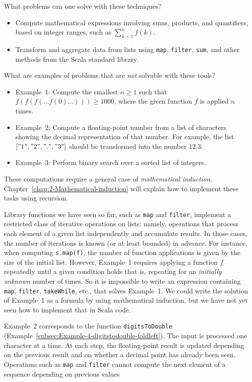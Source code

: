 What problems can one solve with these techniques?
\begin{itemize}
\item Compute mathematical expressions involving sums, products, and quantifiers,
based on integer ranges, such as $\sum_{k=1}^{n}f(k)$.
\item Transform and aggregate data from lists using \lstinline!map!, \lstinline!filter!,\textbf{
}\lstinline!sum!, and other methods from the Scala standard library.
\end{itemize}
What are examples of problems that are \emph{not} solvable with these
tools?
\begin{itemize}
\item Example~1: Compute the smallest $n\geq1$ such that $f(f(f(...f(0)...)))\geq1000$,
where the given function $f$ is applied $n$ times.
\item Example~2: Compute a floating-point number from a list of characters
showing the decimal representation of that number. For example, the
list $\left["1","2",".","3"\right]$ should be transformed into the
number $12.3$. 
\item Example~3: Perform binary search over a sorted list of integers.
\end{itemize}
These computations require a general case of \emph{mathematical induction}.
Chapter\ \ref{chap:2-Mathematical-induction} will explain how to
implement these tasks using recursion.

Library functions we have seen so far, such as \texttt{}\lstinline!map!
and \lstinline!filter!, implement a restricted class of iterative
operations on lists: namely, operations that process each element
of a given list independently and accumulate results. In those cases,
the number of iterations is known (or at least bounded) in advance.
For instance, when computing \lstinline!s.map(f)!, the number of
function applications is given by the size of the initial list. However,
Example\ 1 requires applying a function $f$ repeatedly until a given
condition holds \textemdash{} that is, repeating for an \emph{initially
unknown} number of times. So it is impossible to write an expression
containing \lstinline!map!, \lstinline!filter!, \lstinline!takeWhile!,
etc., that solves Example\ 1. We could write the solution of Example\ 1
as a formula by using mathematical induction, but we have not yet
seen how to implement that in Scala code. 

Example\ 2 corresponds to the function \lstinline!digitsToDouble!
(Example~\ref{subsec:Example-4-digitstodouble-foldleft}). The input
is processed one character at a time. At each step, the floating-point
result is updated depending on the previous result and on whether
a decimal point has already been seen. Operations such as \texttt{}\lstinline!map!
and \texttt{}\lstinline!filter! cannot compute the next element
of a sequence depending on previous values

